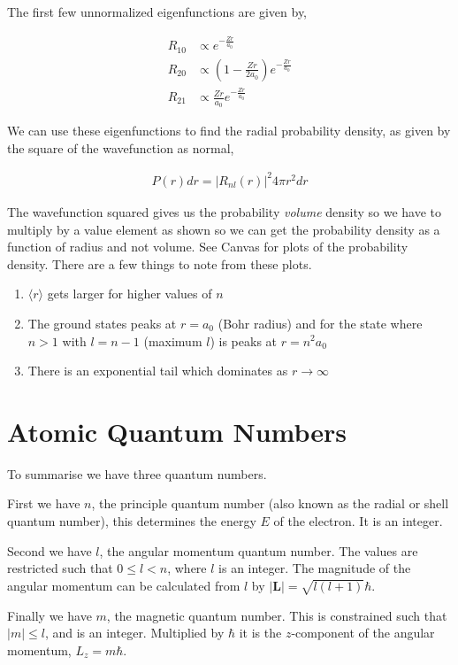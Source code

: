 \documentclass[11pt]{amsart}
\begin{document}
The first few unnormalized eigenfunctions are given by,

\begin{align*}
  R_{10} &\propto e^{-\frac{Zr}{a_0}} \\
  R_{20} &\propto \left(1-\frac{Zr}{2a_0}\right) e^{-\frac{Zr}{a_0}} \\
  R_{21} &\propto \frac{Zr}{a_0} e^{-\frac{Zr}{a_0}}
\end{align*}

We can use these eigenfunctions to find the radial probability density, as given by the square of the wavefunction as normal,

\begin{align*}
  P(r)dr = {|R_{nl}(r)|}^2 4\pi r^2 dr
\end{align*}

The wavefunction squared gives us the probability \textit{volume} density so we have to multiply by a value element as shown so we can get the probability density as a function of radius and not volume. See Canvas for plots of the probability density. There are a few things to note from these plots.

\begin{enumerate}
  \item $\langle r \rangle$ gets larger for higher values of $n$
  \item The ground states peaks at $r = a_0$ (Bohr radius) and for the state where $n > 1$ with $l = n - 1$ (maximum $l$) is peaks at $r = n^2a_0$
  \item There is an exponential tail which dominates as $r \to \infty$
\end{enumerate}


\section{Atomic Quantum Numbers}

To summarise we have three quantum numbers.

First we have $n$, the principle quantum number (also known as the radial or shell quantum number), this determines the energy $E$ of the electron. It is an integer.

Second we have $l$, the angular momentum quantum number. The values are restricted such that $0 \leq l < n$, where $l$ is an integer. The magnitude of the angular momentum can be calculated from $l$ by $|\mathbf{L}| = \sqrt{l(l+1)}\hbar$.

Finally we have $m$, the magnetic quantum number. This is constrained such that $|m| \leq l$, and is an integer. Multiplied by $\hbar$ it is the $z$-component of the angular momentum, $L_z = m\hbar$.
\end{document}

